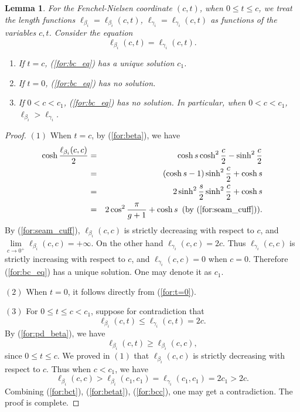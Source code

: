 \documentclass[UTF8]{amsart}
\newtheorem{lemma}[theorem]{Lemma}
\numberwithin{equation}{section}
\theoremstyle{definition}
\theoremstyle{example}
\theoremstyle{remark}
\begin{document}
\begin{lemma}
 For the Fenchel-Nielsen coordinate $(c,t)$, when $0 \le t \le c$, we treat the length functions $\ell_{\beta_i} = \ell_{\beta_i}(c,t)$, $\ell_{\gamma_i} = \ell_{\gamma_i}(c,t)$ as functions of the variables $c, t$. 
 Consider the equation 
 \begin{equation}
  \ell_{\beta_i}(c,t) = \ell_{\gamma_i}(c,t). 
  \label{for:bc_eq}
 \end{equation}
 \begin{enumerate}
  \item If $t=c$, (\ref{for:bc_eq}) has a unique solution $c_1$. 
  \item If $t=0$, (\ref{for:bc_eq}) has no solution. 
  \item If $0<c<c_1$, (\ref{for:bc_eq}) has no solution. In particular, when $0<c<c_1$, $\ell_{\beta_i} > \ell_{\gamma_i}$. 
 \end{enumerate}
 \label{lem:bc_eqs}
\end{lemma}
\begin{proof}
 $(1)$ When $t=c$, by (\ref{for:beta}), we have
 \begin{eqnarray}
  \cosh \frac{\ell_{\beta_i}(c,c)}{2}
  &=& \cosh s \cosh^{2} \frac{c}{2} - \sinh^2 \frac{c}{2} \nonumber \\
  &=& (\cosh s -1) \sinh^2 \frac{c}{2} + \cosh s \nonumber \\
  &=& 2\sinh^2 \frac{s}{2} \sinh^2 \frac{c}{2} + \cosh s \nonumber\\
  &=& 2\cos^2 \frac{\pi}{g+1} + \cosh s \text{\,\,\,(by (\ref{for:seam_cuff})).} \label{for:cbeta}
 \end{eqnarray}
 By (\ref{for:seam_cuff}), $\ell_{\beta_i}(c,c)$ is strictly decreasing with respect to $c$, and $\lim\limits_{c\to 0^+}\ell_{\beta_i}(c,c) = + \infty$. On the other hand $\ell_{\gamma_i} (c,c) = 2c$. Thus $\ell_{\gamma_i}(c,c)$ is strictly increasing with respect to $c$, and $\ell_{\gamma_i}(c,c)=0$ when $c=0$. Therefore  (\ref{for:bc_eq}) has a unique solution. One may denote it as $c_1$. 

 $(2)$ When $t=0$, it follows directly from (\ref{for:t=0}). 

 $(3)$ For $0 \le t \le c < c_1$, suppose for contradiction that 
 \begin{equation}
 \ell_{\beta_i}(c,t) \le  \ell_{\gamma_i}(c,t) = 2c.
 \label{for:bct}
 \end{equation}
 By (\ref{for:pd_beta}), we have
 \begin{equation}
\ell_{\beta_i}(c,t) \ge \ell_{\beta_i}(c,c),
\label{for:betat}
 \end{equation}
 since $0 \le t \le c$. 
 We proved in $(1)$ that $\ell_{\beta_i}(c,c)$ is strictly decreasing with respect to  $c$. Thus when $c<c_1$, we have
\begin{equation}
 \ell_{\beta_i}(c,c) > \ell_{\beta_i}(c_1,c_1) = \ell_{\gamma_i}(c_1,c_1) = 2c_1 > 2c. 
 \label{for:bcc}
\end{equation}
Combining (\ref{for:bct}), (\ref{for:betat}), (\ref{for:bcc}), one may get a contradiction. The proof is complete.
\end{proof}
\end{document}
